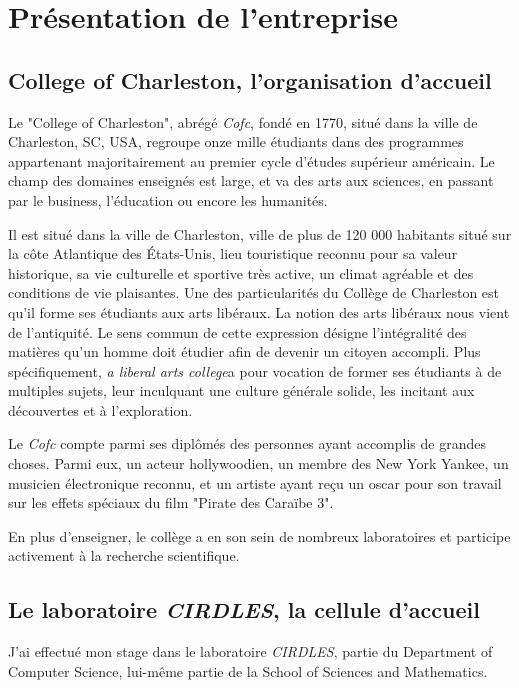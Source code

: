 ﻿\chapter{Présentation de l'entreprise}
\section{College of Charleston, l'organisation d'accueil}

Le "College of Charleston", abrégé \textit{Cofc}, fondé en 1770, situé dans la ville de Charleston, SC, USA, regroupe onze mille étudiants dans des programmes appartenant majoritairement au premier cycle d’études supérieur américain. Le champ des domaines enseignés est large, et va des arts aux sciences, en passant par le business, l'éducation ou encore les humanités.
 
Il est situé dans la ville de Charleston, ville de plus de 120 000 habitants situé sur la côte Atlantique des États-Unis, lieu touristique reconnu pour sa valeur historique, sa vie culturelle et sportive très active, un climat agréable et des conditions de vie plaisantes.
Une des particularités du Collège de Charleston est qu’il forme ses étudiants aux arts libéraux.  La notion des arts libéraux nous vient de l’antiquité. Le sens commun de cette expression désigne l'intégralité des matières qu’un homme doit étudier afin de devenir un citoyen accompli. Plus spécifiquement, \textit{a liberal arts college}a pour vocation de former ses étudiants à de multiples sujets, leur inculquant une culture générale solide, les incitant aux découvertes et à l’exploration.

Le \textit{Cofc} compte parmi ses diplômés des personnes ayant accomplis de grandes choses. Parmi eux, un acteur hollywoodien, un membre des New York Yankee, un musicien électronique reconnu, et un artiste ayant reçu un oscar pour son travail sur les effets spéciaux du film "Pirate des Caraïbe 3".

En plus d’enseigner, le collège a en son sein de nombreux laboratoires et participe activement à la recherche scientifique.

\section{Le laboratoire \textit{CIRDLES}, la cellule d’accueil}
J’ai effectué mon stage dans le laboratoire \textit{CIRDLES}, partie du Department of Computer Science, lui-même partie de la School of Sciences and Mathematics.

